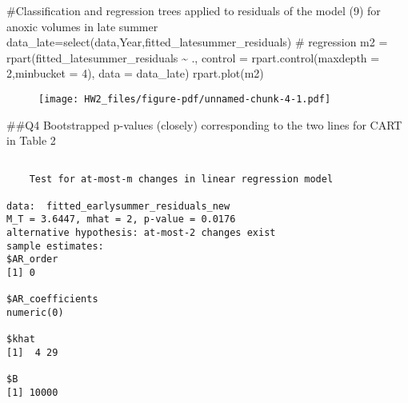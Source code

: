 \documentclass[
  letterpaper,
  DIV=11,
  numbers=noendperiod]{scrartcl}
\newenvironment{Shaded}{\begin{snugshade}}{\end{snugshade}}
\newcommand{\AttributeTok}[1]{\textcolor[rgb]{0.40,0.45,0.13}{#1}}
\newcommand{\CommentTok}[1]{\textcolor[rgb]{0.37,0.37,0.37}{#1}}
\newcommand{\ConstantTok}[1]{\textcolor[rgb]{0.56,0.35,0.01}{#1}}
\newcommand{\DecValTok}[1]{\textcolor[rgb]{0.68,0.00,0.00}{#1}}
\newcommand{\FunctionTok}[1]{\textcolor[rgb]{0.28,0.35,0.67}{#1}}
\newcommand{\NormalTok}[1]{\textcolor[rgb]{0.00,0.23,0.31}{#1}}
\newcommand{\OtherTok}[1]{\textcolor[rgb]{0.00,0.23,0.31}{#1}}
\newcommand{\SpecialCharTok}[1]{\textcolor[rgb]{0.37,0.37,0.37}{#1}}
\begin{document}
\begin{Shaded}
\begin{Highlighting}[]
\CommentTok{\#Classification and regression trees applied to residuals of the model (9) for anoxic volumes in late summer}
\NormalTok{data\_late}\OtherTok{=}\FunctionTok{select}\NormalTok{(data,Year,fitted\_latesummer\_residuals)}
\CommentTok{\# regression}
\NormalTok{m2 }\OtherTok{=} \FunctionTok{rpart}\NormalTok{(fitted\_latesummer\_residuals }\SpecialCharTok{\textasciitilde{}}\NormalTok{ ., }
           \AttributeTok{control =} \FunctionTok{rpart.control}\NormalTok{(}\AttributeTok{maxdepth =} \DecValTok{2}\NormalTok{,}\AttributeTok{minbucket =} \DecValTok{4}\NormalTok{),}
           \AttributeTok{data =}\NormalTok{ data\_late)}
\FunctionTok{rpart.plot}\NormalTok{(m2)}
\end{Highlighting}
\end{Shaded}

\begin{figure}[H]

{\centering \texttt{[image: HW2\_files/figure-pdf/unnamed-chunk-4-1.pdf]}

}

\end{figure}

\#\#Q4 Bootstrapped p-values (closely) corresponding to the two lines
for CART in Table 2

\begin{Shaded}
\end{Shaded}

\begin{verbatim}

    Test for at-most-m changes in linear regression model

data:  fitted_earlysummer_residuals_new
M_T = 3.6447, mhat = 2, p-value = 0.0176
alternative hypothesis: at-most-2 changes exist
sample estimates:
$AR_order
[1] 0

$AR_coefficients
numeric(0)

$khat
[1]  4 29

$B
[1] 10000
\end{verbatim}
\end{document}
